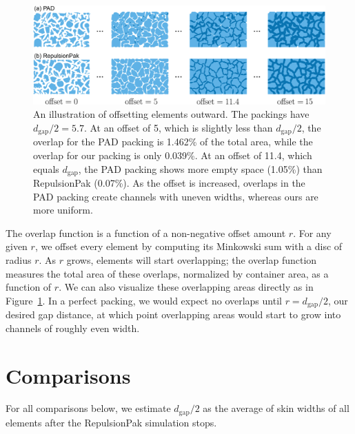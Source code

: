 \begin{figure}
\centering
\includegraphics[width=1.0\textwidth]{figures/metrics/overlap_metric.pdf}
\caption[An illustration of offsetting elements outward]
{\label{fig_overlap_function}
    An illustration of offsetting elements outward. The packings have $d_\mathrm{gap} / 2 = 5.7$.  
    At an offset of 5, which is slightly less than $d_\mathrm{gap} / 2$,
    the overlap for the PAD packing is 1.462\% of the total area, while the overlap for our packing is only 0.039\%.
    At an offset of 11.4, which equals $d_\mathrm{gap}$, the PAD packing shows more empty space (1.05\%) than RepulsionPak (0.07\%).
    As the offset is increased, overlaps in the PAD packing create channels
  with uneven widths, whereas ours are more uniform.
  }
\end{figure}

The overlap function is a function of a non-negative offset amount
$r$.  For any given $r$, we offset every element by computing its Minkowski
sum with a disc of radius $r$.  As $r$ grows, elements will start overlapping;
the overlap function measures the total area of these overlaps, normalized
by container area, as a function of $r$.  We can also visualize these 
overlapping areas directly as in Figure~\ref{fig_overlap_function}.  In a 
perfect packing, we would expect no overlaps until $r=d_\mathrm{gap}/2$,
our desired gap distance, at which point overlapping areas would start to
grow into channels of roughly even width.



\section{Comparisons}

\newtext
{
	For all comparisons below, 
	we estimate $d_\mathrm{gap}/2$ as the average of skin widths of all elements 
	after the RepulsionPak simulation stops.
}

